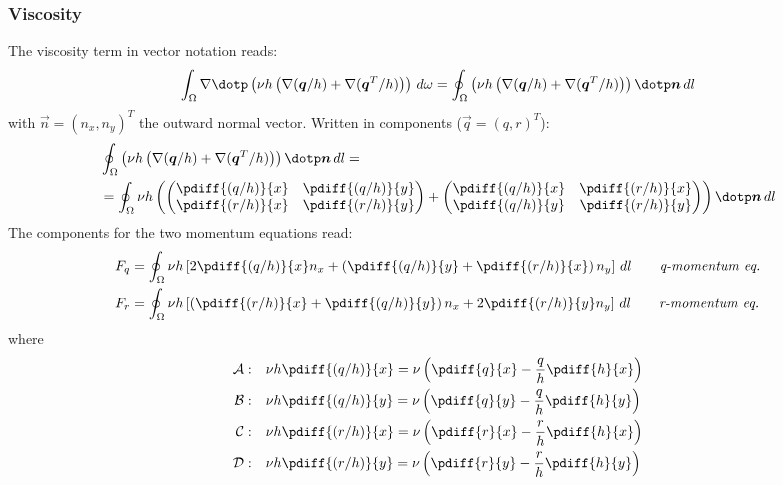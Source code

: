 \subsubsection{Viscosity}
The viscosity term in vector notation reads:
\begin{align}
    \int_\Omega \nabla \dotp \left( \nu h \left(  \nabla (\vec{q}/h) + \nabla (\vec{q}^T/h) \right) \right)\, d\omega =
    \oint_{\Omega}  \left( \nu h \left( \nabla (\vec{q}/h) + \nabla (\vec{q}^T/h) \right) \right) \dotp \vec{n}\, dl
\end{align}
with $\vec{n} = (n_x, n_y)^T$ the outward normal vector.
Written in components ($\vec{q} = (q, r)^T$):
\begin{align}
    &\oint_{\Omega}  \left( \nu h \left( \nabla (\vec{q}/h) + \nabla (\vec{q}^T/h) \right) \right) \dotp \vec{n}\, dl =
    \\
    & =
    \oint_{\Omega} \nu h
    \left(
    \begin{pmatrix}
    \pdiff{(q/h)}{x} & \pdiff{(q/h)}{y}
    \\
    \pdiff{(r/h)}{x} & \pdiff{(r/h)}{y}
    \end{pmatrix}
    +
    \begin{pmatrix}
    \pdiff{(q/h)}{x} & \pdiff{(r/h)}{x}
    \\
    \pdiff{(q/h)}{y} & \pdiff{(r/h)}{y}
   \end{pmatrix}
   \right)
    \dotp \vec{n}\, dl
\end{align}
The components for the two momentum equations read:
\begin{align}
    F_q
    & = \oint_{\Omega} \nu h
    \left[ 2\pdiff{(q/h)}{x} n_x
    + \left(\pdiff{(q/h)}{y} + \pdiff{(r/h)}{x}\right)n_y \right] \, dl
    \qquad \textit{q-momentum eq.}
    \\
    F_r
    & = \oint_{\Omega}  \nu h
    \left[ \left(\pdiff{(r/h)}{x} + \pdiff{(q/h)}{y}\right)n_x
    + 2\pdiff{(r/h)}{y} n_y \right] \, dl
    \qquad \textit{r-momentum eq.}
\end{align}
where
\begin{align}
    \cal{A}: & \quad \nu h \pdiff{(q/h)}{x} = \nu \left( \pdiff{q}{x} - \frac{q}{h}\pdiff{h}{x} \right)
    \\
    \cal{B}: & \quad \nu h \pdiff{(q/h)}{y} = \nu \left( \pdiff{q}{y} - \frac{q}{h}\pdiff{h}{y} \right)
    \\
    \cal{C}: & \quad \nu h \pdiff{(r/h)}{x} = \nu \left( \pdiff{r}{x} - \frac{r}{h}\pdiff{h}{x} \right)
    \\
    \cal{D}: & \quad \nu h \pdiff{(r/h)}{y} = \nu \left( \pdiff{r}{y} - \frac{r}{h}\pdiff{h}{y} \right)
\end{align}
